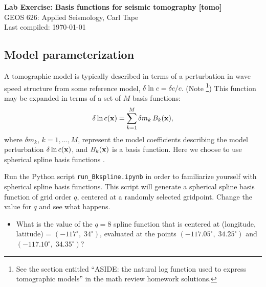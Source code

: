 \documentclass[11pt,titlepage,fleqn]{article}
\begin{document}

\begin{spacing}{1.2}
\centering
{\large \bf Lab Exercise: Basis functions for seismic tomography [tomo]} \\
GEOS 626: Applied Seismology, Carl Tape \\
Last compiled: \today
\end{spacing}


\subsection*{Model parameterization}

A tomographic model is typically described in terms of a perturbation in wave speed structure from some reference model, \ie $\delta\ln c = \delta c/c$.
(Note \footnote{See the section entitled ``ASIDE: the natural log function used to express tomographic models'' in the math review homework solutions.})
This function may be expanded in terms of a set of $M$ basis functions:
%
\begin{equation}
\delta\ln c(\mbox{${\bf x}$})=\sum_{k=1}^M \delta m_k\,B_k(\mbox{${\bf x}$}),
\label{dlnv}
\end{equation}
%
where $\delta m_k$, $k=1,\ldots,M$, represent the model coefficients describing the model perturbation $\delta\ln c(\mbox{${\bf x}$})$, and $B_k(\mbox{${\bf x}$})$ is a basis function. Here we choose to use spherical spline basis functions \citep{WangDahlen1995spline,Wang1998}.

Run the Python script \verb+run_Bkspline.ipynb+ in order to familiarize yourself with spherical spline basis functions. This script will generate a spherical spline basis function of grid order $q$, centered at a randomly selected gridpoint. Change the value for $q$ and see what happens. 

\begin{itemize}
\item What is the value of the $q=8$ spline function that is centered at (longitude, latitude) = $(-117^\circ,\;34^\circ)$, evaluated at the points $(-117.05^\circ,\;34.25^\circ)$ and $(-117.10^\circ,\;34.35^\circ)$?
\end{itemize}

\end{document}
